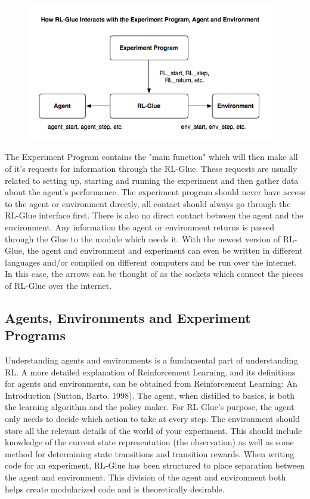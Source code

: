 \documentclass[11pt]{article}
\begin{document}
\begin{figure}
\begin{center}
\includegraphics[height=60mm]{images/glue_connections_no_shadow.png}
\end{center}
\end{figure}

The Experiment Program contains the "main function" which will then make all of it's requests for information through the RL-Glue. These requests are usually related to setting up, starting and running the experiment and then gather data about the agent's performance. The experiment program should never have access to the agent or environment directly, all contact should always go through the RL-Glue interface first.  There is also no direct contact between the agent and the environment. Any information the agent or environment returns is passed through the Glue to the module which needs it.  With the newest version of RL-Glue, the agent and environment and experiment can even be written in different languages and/or compiled on different computers and be run over the internet. In this case, the arrows can be thought of as the sockets which connect the pieces of RL-Glue over the internet.



\subsection{Agents, Environments and Experiment Programs}
Understanding agents and environments is a fundamental part of understanding RL. A more detailed explanation of Reinforcement Learning, and its definitions for agents and environments, can be obtained from Reinforcement Learning: An Introduction (Sutton, Barto. 1998).  The agent, when distilled to basics, is both the learning algorithm and the policy maker. For RL-Glue's purpose, the agent only needs to decide which action to take at every step. The environment should store all the relevant details of the world of your experiment. This should include knowledge of the current state representation (the observation) as well as some method for determining state transitions and transition rewards. When writing code for an experiment, RL-Glue has been structured to place separation between the agent and environment.  This division  of the agent and environment both helps create modularized code and is theoretically desirable.
\end{document}
